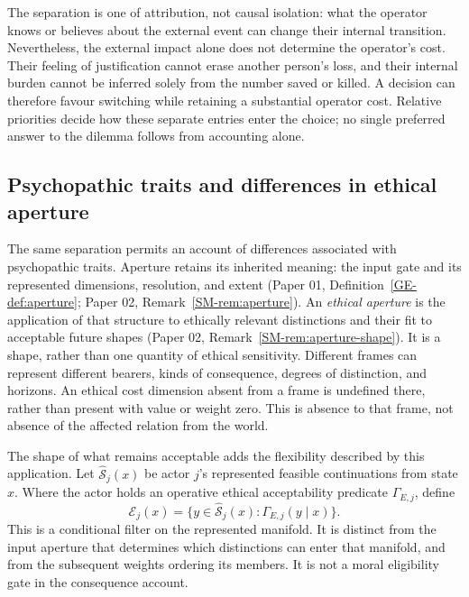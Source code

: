 \documentclass[11pt,a4paper]{article}
\theoremstyle{remark}
\begin{document}
The separation is one of attribution, not causal isolation: what the operator
knows or believes about the external event can change their internal transition.
Nevertheless, the external impact alone does not determine the operator's cost.
Their feeling of justification cannot erase another person's loss, and their
internal burden cannot be inferred solely from the number saved or killed.
A decision can therefore favour switching while retaining a substantial
operator cost. Relative priorities decide how these separate entries enter the
choice; no single preferred answer to the dilemma follows from accounting alone.

\subsection{Psychopathic traits and differences in ethical aperture}

The same separation permits an account of differences associated with
psychopathic traits. Aperture retains its inherited meaning: the input gate
and its represented dimensions, resolution, and extent (Paper 01,
Definition~\ref{GE-def:aperture}; Paper 02, Remark~\ref{SM-rem:aperture}).
An \emph{ethical aperture} is the application of that structure to
ethically relevant distinctions and their fit to acceptable future shapes
(Paper 02, Remark~\ref{SM-rem:aperture-shape}). It is a shape, rather than one
quantity of ethical sensitivity. Different frames can represent different
bearers, kinds of consequence, degrees of distinction, and horizons. An ethical
cost dimension absent from a frame is undefined there, rather than present
with value or weight zero. This is absence to that frame, not absence of the
affected relation from the world.

The shape of what remains acceptable adds the flexibility described by this
application. Let $\widehat{\mathcal S}_j(x)$ be actor $j$'s represented feasible
continuations from state $x$. Where the actor holds an operative ethical
acceptability predicate $\Gamma_{E,j}$, define
\begin{equation}\label{eq:ethical-region}
\mathcal E_j(x)=\{y\in\widehat{\mathcal S}_j(x):
                    \Gamma_{E,j}(y\mid x)\}.
\end{equation}
This is a conditional filter on the represented manifold. It is distinct from
the input aperture that determines which distinctions can enter that manifold,
and from the subsequent weights ordering its members. It is not a moral
eligibility gate in the consequence account.
\end{document}
